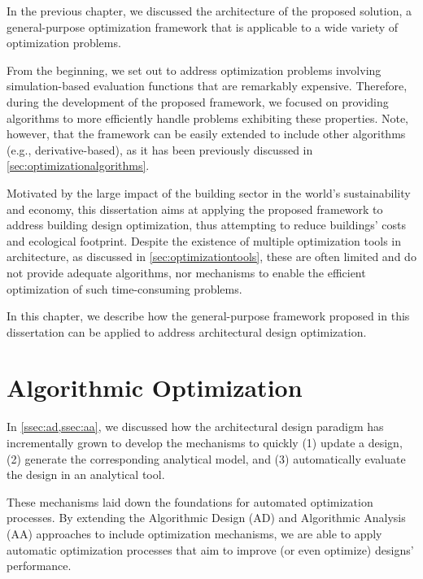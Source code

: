 \label{chap:implement}

In the previous chapter, we discussed the architecture of the proposed solution, a general-purpose optimization framework that is applicable to a wide variety of optimization problems. 

From the beginning, we set out to address optimization problems involving simulation-based evaluation functions that are remarkably expensive. Therefore, during the development of the proposed framework, we focused on providing algorithms to more efficiently handle problems exhibiting these properties. Note, however, that the framework can be easily extended to include other algorithms (e.g., derivative-based), as it has been previously discussed in \cref{sec:optimizationalgorithms}. 

Motivated by the large impact of the building sector in the world's sustainability and economy, this dissertation aims at applying the proposed framework to address building design optimization, thus attempting to reduce buildings' costs and ecological footprint. Despite the existence of multiple optimization tools in architecture, as discussed in \cref{sec:optimizationtools}, these are often limited and do not provide adequate algorithms, nor mechanisms to enable the efficient optimization of such time-consuming problems.

In this chapter, we describe how the general-purpose framework proposed in this dissertation can be applied to address architectural design optimization. 

\section{Algorithmic Optimization}
In \cref{ssec:ad,ssec:aa}, we discussed how the architectural design paradigm has incrementally grown to develop the mechanisms to quickly (1) update a design, (2) generate the corresponding analytical model, and (3) automatically evaluate the design in an analytical tool.%

These mechanisms laid down the foundations for automated optimization processes. By extending the Algorithmic Design (\ac{AD}) and Algorithmic Analysis (\ac{AA}) approaches to include optimization mechanisms, we are able to apply automatic optimization processes that aim to improve (or even optimize) designs' performance. 

